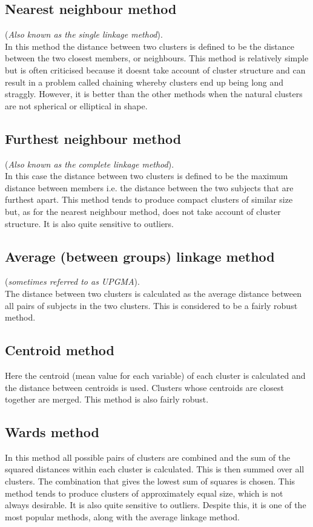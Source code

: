 \documentclass[a4paper,12pt]{article}
\begin{document}
\subsection{Nearest neighbour method} 
(\textit{Also known as the single linkage method}).\\
In this method the distance between two clusters is defined to be the distance between
the two closest members, or neighbours. This method is relatively simple but is often
criticised because it doesnt take account of cluster structure and can result in a problem
called chaining whereby clusters end up being long and straggly. However, it is better
than the other methods when the natural clusters are not spherical or elliptical in shape.

\subsection{Furthest neighbour method}
(\textit{Also known as the complete linkage method}).\\
In this case the distance between two clusters is defined to be the maximum distance
between members  i.e. the distance between the two subjects that are furthest apart.
This method tends to produce compact clusters of similar size but, as for the nearest
neighbour method, does not take account of cluster structure. It is also quite sensitive
to outliers.

\subsection{Average (between groups) linkage method }
(\textit{sometimes referred to as UPGMA}).\\
The distance between two clusters is calculated as the average distance between all pairs
of subjects in the two clusters. This is considered to be a fairly robust method.

\subsection{Centroid method}
Here the centroid (mean value for each variable) of each cluster is calculated and the
distance between centroids is used. Clusters whose centroids are closest together are
merged. This method is also fairly robust.

\subsection{Wards method}
In this method all possible pairs of clusters are combined and the sum of the squared
distances within each cluster is calculated. This is then summed over all clusters. The
combination that gives the lowest sum of squares is chosen. This method tends to
produce clusters of approximately equal size, which is not always desirable. It is also
quite sensitive to outliers. Despite this, it is one of the most popular methods, along
with the average linkage method.
\end{document}
